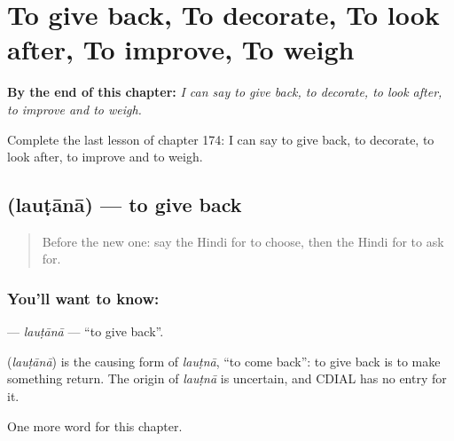 
\chapter{To give back, To decorate, To look after, To improve, To weigh}
\label{ch:hi-to-give-back-to-decorate-to-look-after-to-improve-to-weigh}

\begin{chapteropening}
\textbf{By the end of this chapter:} \emph{I can say to give back, to decorate, to look after, to improve and to weigh.}

Complete the last lesson of chapter 174: I can say to give back, to decorate, to look after, to improve and to weigh.
\end{chapteropening}

\section[\texorpdfstring{\hi{लौटाना} (lauṭānā)}{लौटाना (lauṭānā)}]{ (lauṭānā) — to give back}

\label{lesson:HI-C174-lautana}



\begin{quote}
Before the new one: say the Hindi for to choose, then the Hindi for to ask for.
\end{quote}

\subsection*{You'll want to know: }
\textbf{} — \emph{lauṭānā} — \textquotedblleft{}to give back\textquotedblright{}.

\begin{cousinweb}
\textbf{} (\emph{lauṭānā}) is the causing form of \emph{lauṭnā}, \textquotedblleft{}to come back\textquotedblright{}: to give back is to make something return. The origin of \emph{lauṭnā} is uncertain, and CDIAL has no entry for it.
\end{cousinweb}

\begin{grammarlens}[title={What you've built}]
One more word for this chapter.
\end{grammarlens}

